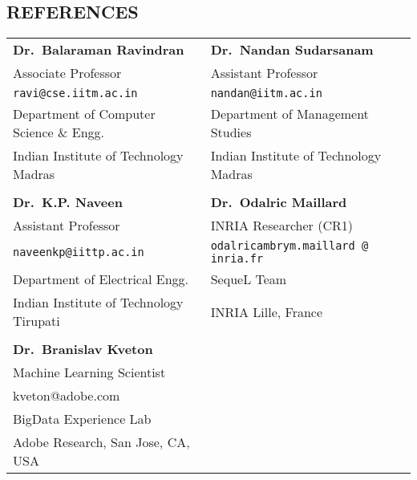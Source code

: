 \documentclass[margin,11pt]{res}
\begin{document}
\begin{resume}
\section{REFERENCES}
\begin{tabular}{lll}
\textbf{Dr.~Balaraman Ravindran} & \textbf{Dr.~Nandan Sudarsanam} \\
Associate Professor & Assistant Professor\\
\texttt{ravi@cse.iitm.ac.in} & \texttt{nandan@iitm.ac.in}\\
Department of Computer Science \& Engg. & Department of Management Studies\\ 
Indian Institute of Technology Madras & Indian Institute of Technology Madras\\
\\
\textbf{Dr.~K.P. Naveen}  & \textbf{Dr.~Odalric Maillard} \\
Assistant Professor & INRIA Researcher (CR1) \\
\texttt{naveenkp@iittp.ac.in} & \texttt{odalricambrym.maillard @ inria.fr}\\
Department of Electrical Engg. & SequeL Team \\ 
Indian Institute of Technology Tirupati & INRIA Lille, France\\
\\
\textbf{Dr.~Branislav Kveton}\\
Machine Learning Scientist\\
kveton@adobe.com\\
BigData Experience Lab\\
Adobe Research, San Jose, CA, USA
\end{tabular}



\end{resume}
\end{document}
